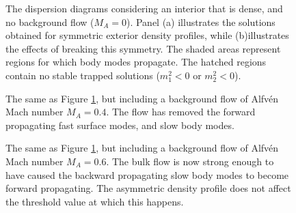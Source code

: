 \begin{figure}[t]
\centering
{}
\caption{The dispersion diagrams considering an interior that is dense, and no background flow ($M_A = 0$).
Panel (a) illustrates the solutions obtained for symmetric exterior density profiles, while (b)illustrates the effects of breaking this symmetry.
The shaded areas represent regions for which body modes propagate.
The hatched regions contain no stable trapped solutions ($m_1^2 < 0$ or $m_2^2 < 0$).}
\label{fig:dense0}
\end{figure}

\begin{figure}[t]
\centering
{}
\caption{The same as Figure \ref{fig:dense0}, but including a background flow of Alfv\'en Mach number $M_A = 0.4$.
The flow has removed the forward propagating fast surface modes, and slow body modes.}
\label{fig:dense1}
\end{figure}

\begin{figure}[t]
\centering
{}
\caption{The same as Figure \ref{fig:dense0}, but including a background flow of Alfv\'en Mach number $M_A = 0.6$.
The bulk flow is now strong enough to have caused the backward propagating slow body modes to become forward propagating.
The asymmetric density profile does not affect the threshold value at which this happens.}
\label{fig:dense2}
\end{figure}

